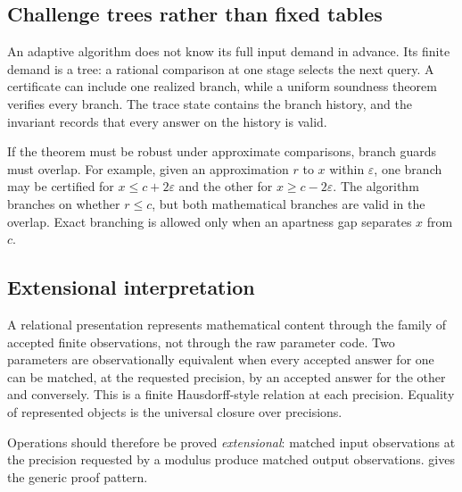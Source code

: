 \subsection{Challenge trees rather than fixed tables}

An adaptive algorithm does not know its full input demand in advance.  Its
finite demand is a tree: a rational comparison at one stage selects the next
query.  A certificate can include one realized branch, while a uniform
soundness theorem verifies every branch.  The trace state contains the branch
history, and the invariant records that every answer on the history is valid.

If the theorem must be robust under approximate comparisons, branch guards
must overlap.  For example, given an approximation \(r\) to \(x\) within
\(\varepsilon\), one branch may be certified for
\(x\le c+2\varepsilon\) and the other for \(x\ge c-2\varepsilon\).  The
algorithm branches on whether \(r\le c\), but both mathematical branches are
valid in the overlap.  Exact branching is allowed only when an apartness gap
separates \(x\) from \(c\).

\subsection{Extensional interpretation}

A relational presentation represents mathematical content through the family
of accepted finite observations, not through the raw parameter code.  Two
parameters are observationally equivalent when every accepted answer for one
can be matched, at the requested precision, by an accepted answer for the
other and conversely.  This is a finite Hausdorff-style relation at each
precision.  Equality of represented objects is the universal closure over
precisions.

Operations should therefore be proved \emph{extensional}: matched input
observations at the precision requested by a modulus produce matched output
observations.   gives the generic proof pattern.
